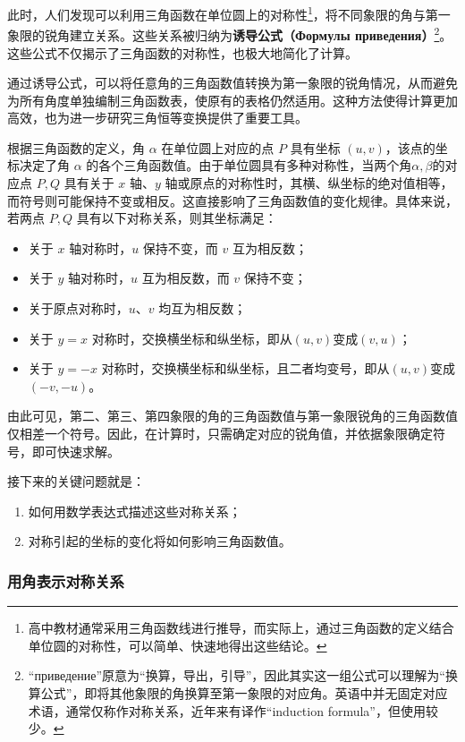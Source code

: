 此时，人们发现可以利用三角函数在单位圆上的对称性\footnote{高中教材通常采用三角函数线进行推导，而实际上，通过三角函数的定义结合单位圆的对称性，可以简单、快速地得出这些结论。}，将不同象限的角与第一象限的锐角建立关系。这些关系被归纳为\textbf{诱导公式（Формулы приведения）}\footnote{“приведение”原意为“换算，导出，引导”，因此其实这一组公式可以理解为“换算公式”，即将其他象限的角换算至第一象限的对应角。英语中并无固定对应术语，通常仅称作对称关系，近年来有译作“induction formula”，但使用较少。}。这些公式不仅揭示了三角函数的对称性，也极大地简化了计算。

通过诱导公式，可以将任意角的三角函数值转换为第一象限的锐角情况，从而避免为所有角度单独编制三角函数表，使原有的表格仍然适用。这种方法使得计算更加高效，也为进一步研究三角恒等变换提供了重要工具。

根据三角函数的定义，角 $\alpha$ 在单位圆上对应的点 $P$ 具有坐标 $(u,v)$，该点的坐标决定了角 $\alpha$ 的各个三角函数值。由于单位圆具有多种对称性，当两个角$\alpha,\beta$的对应点 $P, Q$ 具有关于 $x$ 轴、$y$ 轴或原点的对称性时，其横、纵坐标的绝对值相等，而符号则可能保持不变或相反。这直接影响了三角函数值的变化规律。具体来说，若两点 $P, Q$ 具有以下对称关系，则其坐标满足：
\begin{itemize}
\item 关于 $x$ 轴对称时，$u$ 保持不变，而 $v$ 互为相反数；
\item 关于 $y$ 轴对称时，$u$ 互为相反数，而 $v$ 保持不变；
\item 关于原点对称时，$u$、$v$ 均互为相反数；
\item 关于 $y = x$ 对称时，交换横坐标和纵坐标，即从$(u,v)$变成$(v,u)$；
\item 关于 $y = -x$ 对称时，交换横坐标和纵坐标，且二者均变号，即从$(u,v)$变成$(-v,-u)$。
\end{itemize}

由此可见，第二、第三、第四象限的角的三角函数值与第一象限锐角的三角函数值仅相差一个符号。因此，在计算时，只需确定对应的锐角值，并依据象限确定符号，即可快速求解。

接下来的关键问题就是：
\begin{enumerate}
\item 如何用数学表达式描述这些对称关系；
\item 对称引起的坐标的变化将如何影响三角函数值。
\end{enumerate}

\subsubsection{用角表示对称关系}

